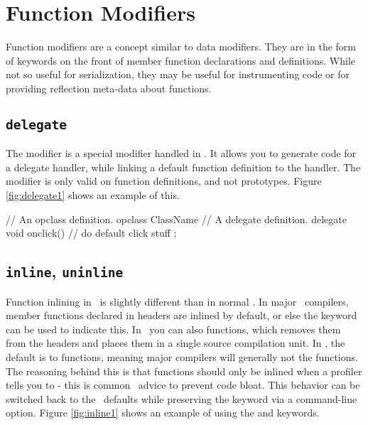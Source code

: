 \section{Function Modifiers}

Function modifiers are a concept similar to data modifiers.  They are in the form of keywords on the front of member function declarations and definitions.  While not so useful for serialization, they may be useful for instrumenting code or for providing reflection meta-data about functions.

\subsection{{\tt delegate}}

The  modifier is a special modifier handled in \opCPP.  It allows you to generate code for a delegate handler, while linking a default function definition to the handler.  The  modifier is only valid on function definitions, and not prototypes.  Figure \ref{fig:delegate1} shows an example of this.

\begin{opcpp}[label={fig:delegate1},caption={the delegate function modifier in \opCPP.}]
// An opclass definition.
opclass ClassName
{
	// A delegate definition.
	delegate void onclick()
	{
		// do default click stuff
	}
};
\end{opcpp}

\subsection{{\tt inline}, {\tt uninline}}

Function inlining in \opCPP\ is slightly different than in normal \cpp.  In major \cpp\ compilers, member functions declared in headers are inlined by default, or else the  keyword can be used to indicate this.  In \opCPP\ you can also  functions, which removes them from the headers and places them in a single source compilation unit.  In \opCPP, the default is to  functions, meaning major compilers will generally not  the functions.  The reasoning behind this is that functions should only be inlined when a profiler tells you to - this is common \cpp\ advice to prevent code bloat.  This behavior can be switched back to the \cpp\ defaults while preserving the  keyword via a command-line option.  Figure \ref{fig:inline1} shows an example of using the  and  keywords.

